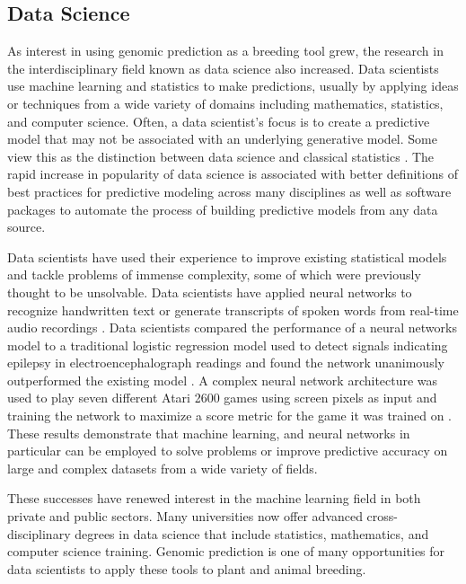 \subsection*{Data Science}

As interest in using genomic prediction as a breeding tool grew, the research in 
the interdisciplinary field known as data science also increased. Data scientists 
use machine learning and statistics to make 
predictions, usually by applying ideas or techniques from a wide variety of domains 
including mathematics, statistics, and computer science. Often, a data scientist's focus is to
create a predictive model that may not be associated with an underlying generative model. 
Some view this as the distinction between data science and classical statistics 
\citep{donoho2015, breiman2001}. The rapid increase in popularity of data science
is associated with better definitions of best practices for predictive modeling
across many disciplines as well as software packages to automate the 
process of building predictive models from any data source.

Data scientists have used their experience to improve existing statistical 
models and tackle problems of immense complexity, some of which were previously 
thought to be unsolvable. Data scientists have applied neural networks to recognize 
handwritten text or generate transcripts of spoken words from real-time audio recordings \citep{lang1990}.
Data scientists compared the performance of a neural networks model to a traditional 
logistic regression model used to detect signals indicating epilepsy in electroencephalograph 
readings and found the network unanimously outperformed the existing model \citep{subasi2005}.
A complex neural network architecture was used to play seven different Atari 2600 
games using screen pixels as input and training the network to maximize a score metric 
for the game it was trained on \citep{mnih2013}. These results demonstrate that machine learning,
and neural networks in particular can be employed to solve problems or improve predictive accuracy
on large and complex datasets from a wide variety of fields.

These successes have renewed interest in the machine learning field in both
private and public sectors. Many universities now offer advanced cross-disciplinary
degrees in data science that include statistics, mathematics, and computer
science training. Genomic prediction is one of many opportunities for data scientists
to apply these tools to plant and animal breeding.

